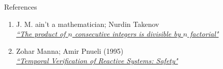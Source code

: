 \documentclass[xcolor=dvipsnames]{beamer}
\begin{document}
\begin{frame}{References}

\begin{enumerate}
	\item J. M. ain't a mathematician;
 Nurdin Takenov\\
	\href{https://math.stackexchange.com/questions/12065/the-product-of-n-consecutive-integers-is-divisible-by-n-factorial}{\textit{``The product of $n$ consecutive integers is divisible by $n$ factorial"}}
	
	\item Zohar Manna; Amir Pnueli (1995)\\
	\href{http://tinyurl.com/3467npny}{\textit{``Temporal Verification of Reactive Systems: Safety"}}
	
\end{enumerate}

\end{frame}
\end{document}
